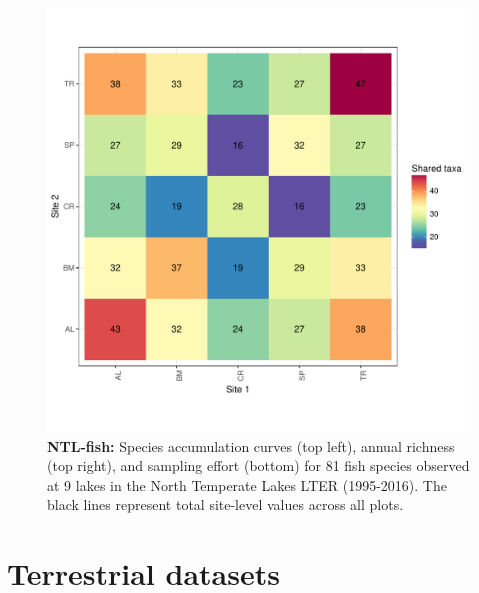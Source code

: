 \documentclass[11pt, oneside]{article}
\begin{document}
\begin{figure}[h!]
\includegraphics[scale = 0.4]{ntl-fish-stanleyLottig_spp_shared.pdf}
\caption{{\bf NTL-fish:} Species accumulation curves (top left),  annual richness (top right), and sampling effort (bottom)  for 81 fish species observed at 9 lakes in the North Temperate Lakes LTER (1995-2016). The black lines represent total site-level values across all plots.}
\label{ntl-fish}
\end{figure}


\section {Terrestrial datasets}

%
%
\end{document}
